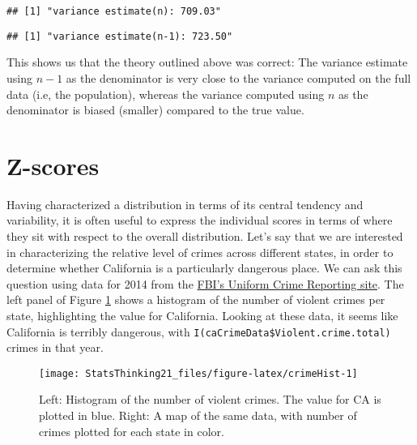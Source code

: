 \documentclass[]{book}
\newenvironment{Shaded}{\begin{snugshade}}{\end{snugshade}}
\newcommand{\KeywordTok}[1]{\textcolor[rgb]{0.13,0.29,0.53}{\textbf{#1}}}
\newcommand{\StringTok}[1]{\textcolor[rgb]{0.31,0.60,0.02}{#1}}
\newcommand{\NormalTok}[1]{#1}
\theoremstyle{definition}
\theoremstyle{definition}
\theoremstyle{definition}
\theoremstyle{remark}
\begin{document}
\begin{verbatim}
## [1] "variance estimate(n): 709.03"
\end{verbatim}

\begin{Shaded}
\end{Shaded}

\begin{verbatim}
## [1] "variance estimate(n-1): 723.50"
\end{verbatim}

This shows us that the theory outlined above was correct: The variance
estimate using \(n - 1\) as the denominator is very close to the
variance computed on the full data (i.e, the population), whereas the
variance computed using \(n\) as the denominator is biased (smaller)
compared to the true value.

\section{Z-scores}\label{z-scores}

Having characterized a distribution in terms of its central tendency and
variability, it is often useful to express the individual scores in
terms of where they sit with respect to the overall distribution. Let's
say that we are interested in characterizing the relative level of
crimes across different states, in order to determine whether California
is a particularly dangerous place. We can ask this question using data
for 2014 from the
\href{https://www.ucrdatatool.gov/Search/Crime/State/RunCrimeOneYearofData.cfm}{FBI's
Uniform Crime Reporting site}. The left panel of Figure
\ref{fig:crimeHist} shows a histogram of the number of violent crimes
per state, highlighting the value for California. Looking at these data,
it seems like California is terribly dangerous, with
\texttt{I(caCrimeData\$Violent.crime.total)} crimes in that year.

\begin{figure}
\texttt{[image: StatsThinking21\_files/figure-latex/crimeHist-1]} \caption{Left: Histogram of the number of violent crimes.  The value for CA is plotted in blue. Right: A map of the same data, with number of crimes plotted for each state in color.}\label{fig:crimeHist}
\end{figure}
\end{document}
